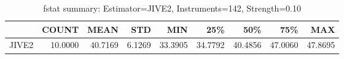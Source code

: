 \begin{table}[ht]
\centering
\caption{fstat summary: Estimator=JIVE2, Instruments=142, Strength=0.10}
\begin{tabular}{lrrrrrrrr}
\toprule
 & COUNT & MEAN & STD & MIN & 25\% & 50\% & 75\% & MAX \\
\midrule
JIVE2 & 10.0000 & 40.7169 & 6.1269 & 33.3905 & 34.7792 & 40.4856 & 47.0060 & 47.8695 \\
\bottomrule
\end{tabular}
\end{table}

